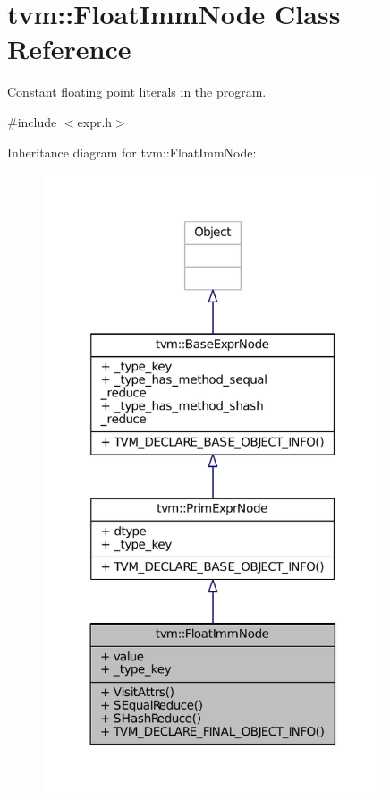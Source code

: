 \hypertarget{classtvm_1_1FloatImmNode}{}\section{tvm\+:\+:Float\+Imm\+Node Class Reference}
\label{classtvm_1_1FloatImmNode}


Constant floating point literals in the program.  




{\ttfamily \#include $<$expr.\+h$>$}



Inheritance diagram for tvm\+:\+:Float\+Imm\+Node\+:
\nopagebreak
\begin{figure}[H]
\begin{center}
\leavevmode
\includegraphics[width=285pt]{classtvm_1_1FloatImmNode__inherit__graph}
\end{center}
\end{figure}


